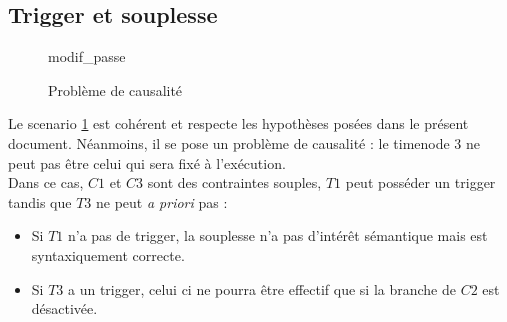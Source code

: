 \documentclass[10pt,a4paper]{article}
\begin{document}
	\subsection{Trigger et souplesse}

	\begin{figure}[htp]
		\centering
		
		\schemaScenario modif_passe
		\caption{Problème de causalité}
		\label{S:modif_passe}
	\end{figure}

Le scenario \ref{S:modif_passe} est cohérent et respecte les hypothèses posées dans le présent document. Néanmoins, il se pose un problème de causalité : le timenode 3 ne peut pas être celui qui sera fixé à l'exécution. \\
Dans ce cas, $C1$ et $C3$ sont des contraintes souples, $T1$ peut posséder un trigger tandis que $T3$ ne peut \textit{a priori} pas :
	\begin{itemize}
		\item Si $T1$ n'a pas de trigger, la souplesse n'a pas d'intérêt sémantique mais est syntaxiquement correcte.
		\item Si $T3$ a un trigger, celui ci ne pourra être effectif que si la branche de $C2$ est désactivée.
	\end{itemize} 
\end{document}
